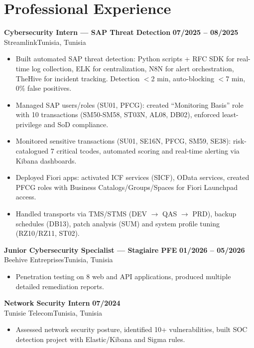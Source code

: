 \documentclass[a4paper,10pt]{article}
\newcommand{\cventry}[4]{\textbf{#1} \hfill \textbf{#4}\\[1pt]#2{\ifx\relax#3\relax\else, #3\fi}\par\vspace{1pt}}
\begin{document}
\section{Professional Experience}
\cventry{Cybersecurity Intern — SAP Threat Detection}{Streamlink}{Tunisia}{07/2025 -- 08/2025}
\begin{itemize}
  \item Built automated SAP threat detection: Python scripts + RFC SDK for real-time log collection, ELK for centralization, N8N for alert orchestration, TheHive for incident tracking. Detection $<$2 min, auto-blocking $<$7 min, 0\% false positives.
  \item Managed SAP users/roles (SU01, PFCG): created ``Monitoring Basis'' role with 10 transactions (SM50-SM58, ST03N, AL08, DB02), enforced least-privilege and SoD compliance.
  \item Monitored sensitive transactions (SU01, SE16N, PFCG, SM59, SE38): risk-catalogued 7 critical tcodes, automated scoring and real-time alerting via Kibana dashboards.
  \item Deployed Fiori apps: activated ICF services (SICF), OData services, created PFCG roles with Business Catalogs/Groups/Spaces for Fiori Launchpad access.
  \item Handled transports via TMS/STMS (DEV $\rightarrow$ QAS $\rightarrow$ PRD), backup schedules (DB13), patch analysis (SUM) and system profile tuning (RZ10/RZ11, ST02).
\end{itemize}
\cventry{Junior Cybersecurity Specialist --- Stagiaire PFE}{Beehive Entreprises}{Tunisia}{01/2026 -- 05/2026}
\begin{itemize}
  \item Penetration testing on 8 web and API applications, produced multiple detailed remediation reports.
\end{itemize}
\cventry{Network Security Intern}{Tunisie Telecom}{Tunisia}{07/2024}
\begin{itemize}
  \item Assessed network security posture, identified 10+ vulnerabilities, built SOC detection project with Elastic/Kibana and Sigma rules.
\end{itemize}
\end{document}
